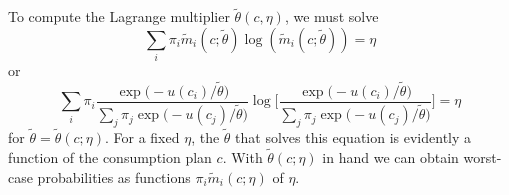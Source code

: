 \begin{enumerate}
 To compute the Lagrange multiplier $\tilde \theta(c, \eta)$, we must solve
\[ \sum_i \pi_i \tilde m_i (c;\tilde \theta ) \log (\tilde m_i (c;\tilde \theta ))  = \eta \]
or
\begin{equation}\label{eqn:entropy_grand}
\sum_i \pi_i \frac{ \exp \bigl(- u(c_i)/\tilde \theta\bigr)}{\sum_j \pi_j \exp \bigl(- u(c_j)/\tilde \theta\bigr) }
\log \biggl[\frac{ \exp \bigl(- u(c_i)/\tilde \theta\bigr)}{\sum_j \pi_j \exp \bigl(- u(c_j)/\tilde \theta\bigr) }
\biggr] = \eta \end{equation}
for $\tilde \theta = \tilde \theta(c; \eta)$.  For a fixed $\eta$, the $\tilde \theta$ that solves this equation is evidently
a function of the consumption plan $c$. With $\tilde \theta(c;\eta)$ in hand we can
obtain worst-case probabilities as functions $ \pi_i\tilde m_i(c;\eta)$ of $\eta$.
% 


\end{enumerate}
